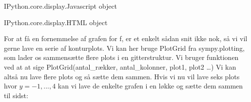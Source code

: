 \documentclass[letterpaper,10pt,english]{jupyterBook}
\begin{document}
\begin{sphinxVerbatim}[commandchars=\\\{\}]
\PYGZlt{}IPython.core.display.Javascript object\PYGZgt{}
\end{sphinxVerbatim}

\begin{sphinxVerbatim}[commandchars=\\\{\}]
\PYGZlt{}IPython.core.display.HTML object\PYGZgt{}
\end{sphinxVerbatim}

For at få en fornemmelse af grafen for f, er et enkelt sådan snit ikke nok, så vi vil gerne lave en serie af konturplots. Vi kan her bruge PlotGrid fra sympy.plotting, som lader os sammensætte flere plots i en gitterstruktur. Vi bruger funktionen ved at at sige PlotGrid(antal\_rækker, antal\_kolonner, plot1, plot2 …)
Vi kan altså nu lave flere plots og så sætte dem sammen. Hvis vi nu vil lave seks plots hvor \(y = -1,...,4\) kan vi lave de enkelte grafen i en løkke og sætte dem sammen til sidst:
\end{document}
